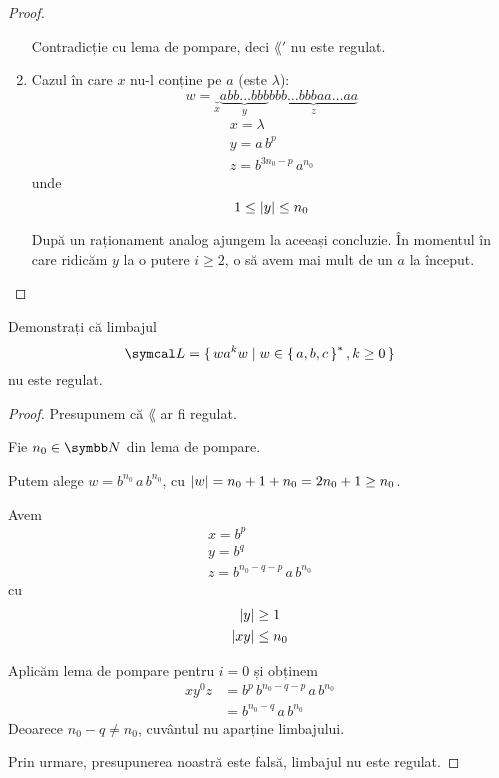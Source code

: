 \begin{proof}
\begin{enumerate}
              Contradicție cu lema de pompare, deci \(\lang'\) nu este regulat.

        \item Cazul în care \(x\) nu-l conține pe \(a\) (este \(\lambda\)):
              \[w = \underbrace{}_{x} \underbrace{a bb\dots{}bbb}_{y} \underbrace{bbb\dots{}bbb aa\dots{}aa}_{z}\]
              \begin{gather*}
                  x = \lambda \\
                  y = a \, b^p \\
                  z = b^{3 n_0 - p} \, a^{n_0}
              \end{gather*}
              unde
              \[1 \leq \left\lvert y\right\rvert \leq n_0\]

              După un raționament analog ajungem la aceeași concluzie. În momentul în care ridicăm \(y\) la o putere \(i \geq 2\), o să avem mai mult de un \(a\) la început.
    \end{enumerate}

\end{proof}

\begin{exercise}
    Demonstrați că limbajul
    \[\lang = \set{ w a^k w | w \in \set{a, b, c}^*, k \geq 0 }\]
    nu este regulat.
\end{exercise}
\begin{proof}
    Presupunem că \(\lang\) ar fi regulat.

    Fie \(n_0 \in \naturals\) din lema de pompare.

    Putem alege \(w = b^{n_0} \, a \, b^{n_0}\), cu \(\left\lvert w\right\rvert = n_0 + 1 + n_0 = 2 n_0 + 1 \geq n_0\).

    Avem
    \begin{gather*}
        x = b^{p} \\
        y = b^{q} \\
        z = b^{n_0 - q - p} \, a \, b^{n_0}
    \end{gather*}
    cu
    \begin{align*}
        \left\lvert y\right\rvert   & \geq 1   \\
        \left\lvert x y\right\rvert & \leq n_0
    \end{align*}

    Aplicăm lema de pompare pentru \(i = 0\) și obținem
    \begin{align*}
        x y^0 z & = b^p \, b^{n_0 - q - p} \, a \, b^{n_0} \\
                & = b^{n_0 - q} \, a \, b^{n_0}
    \end{align*}
    Deoarece \(n_0 - q \neq n_0\), cuvântul nu aparține limbajului.

    Prin urmare, presupunerea noastră este falsă, limbajul nu este regulat.
\end{proof}

